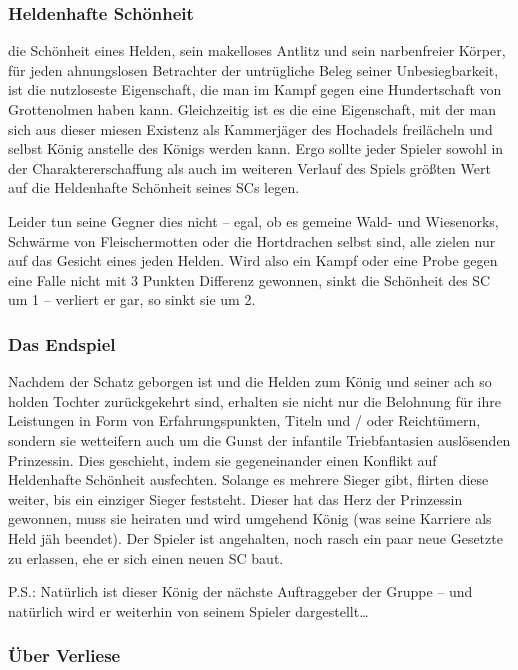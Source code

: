 
\subsubsection{Heldenhafte Schönheit}

die Schönheit eines Helden, sein makelloses Antlitz und sein narbenfreier Körper, für jeden ahnungslosen Betrachter der untrügliche Beleg seiner Unbesiegbarkeit, ist die nutzloseste Eigenschaft, die man im Kampf gegen eine Hundertschaft von Grottenolmen haben kann. Gleichzeitig ist es die eine Eigenschaft, mit der man sich aus dieser miesen Existenz als Kammerjäger des Hochadels freilächeln und selbst König anstelle des Königs werden kann. Ergo sollte jeder Spieler sowohl in der Charaktererschaffung als auch im weiteren Verlauf des Spiels größten Wert auf die Heldenhafte Schönheit seines SCs legen.

Leider tun seine Gegner dies nicht -- egal, ob es gemeine Wald- und Wiesenorks, Schwärme von Fleischermotten oder die Hortdrachen selbst sind, alle zielen nur auf das Gesicht eines jeden Helden. Wird also ein Kampf oder eine Probe gegen eine Falle nicht mit 3 Punkten Differenz gewonnen, sinkt die Schönheit des SC um 1 -- verliert er gar, so sinkt sie um 2.

 
\subsubsection{Das Endspiel}

Nachdem der Schatz geborgen ist und die Helden zum König und seiner ach so holden Tochter zurückgekehrt sind, erhalten sie nicht nur die Belohnung für ihre Leistungen in Form von Erfahrungspunkten, Titeln und / oder Reichtümern, sondern sie wetteifern auch um die Gunst der infantile Triebfantasien auslösenden Prinzessin. Dies geschieht, indem sie gegeneinander einen Konflikt auf Heldenhafte Schönheit ausfechten. Solange es mehrere Sieger gibt, flirten diese weiter, bis ein einziger Sieger feststeht. Dieser hat das Herz der Prinzessin gewonnen, muss sie heiraten und wird umgehend König (was seine Karriere als Held jäh beendet). Der Spieler ist angehalten, noch rasch ein paar neue Gesetzte zu erlassen, ehe er sich einen neuen SC baut.

P.S.: Natürlich ist dieser König der nächste Auftraggeber der Gruppe -- und natürlich wird er weiterhin von seinem Spieler dargestellt\dots

 
\subsubsection{Über Verliese}

